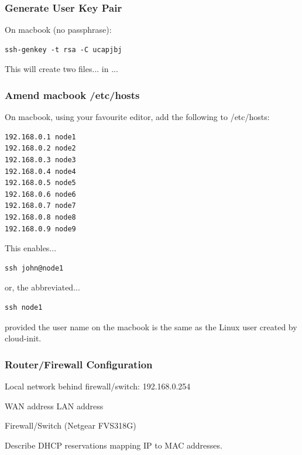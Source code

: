 \documentclass{article}
\begin{document}
\subsubsection{Generate User Key Pair}

On macbook (no passphrase):

\lstset{frameround=tttt}
\begin{lstlisting}[frame=single]
ssh-genkey -t rsa -C ucapjbj
\end{lstlisting}

This will create two files... in ...



\subsubsection{Amend macbook /etc/hosts}

On macbook, using your favourite editor, add the following to /etc/hosts:

\lstset{frameround=tttt}
\begin{lstlisting}[frame=single]
192.168.0.1 node1
192.168.0.2 node2
192.168.0.3 node3
192.168.0.4 node4
192.168.0.5 node5
192.168.0.6 node6
192.168.0.7 node7
192.168.0.8 node8
192.168.0.9 node9
\end{lstlisting}

This enables...

\lstset{frameround=tttt}
\begin{lstlisting}[frame=single]
ssh john@node1
\end{lstlisting}

or, the abbreviated...

\lstset{frameround=tttt}
\begin{lstlisting}[frame=single]
ssh node1
\end{lstlisting}

provided the user name on the macbook is the same as the Linux user created by cloud-init.



\subsubsection{Router/Firewall Configuration}

Local network behind firewall/switch: 192.168.0.254

WAN address
LAN address

Firewall/Switch (Netgear FVS318G)

Describe DHCP reservations mapping IP to MAC addresses.
\end{document}
